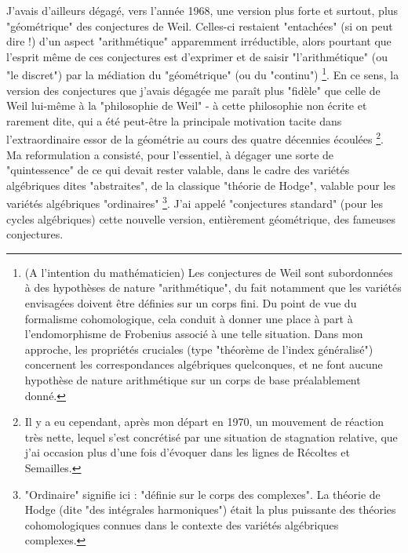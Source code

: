 J'avais d'ailleurs dégagé, vers l'année 1968, une version plus forte et surtout, plus "géométrique" des conjectures de Weil. Celles-ci restaient "entachées" (si on peut dire !) d'un aspect "arithmétique" apparemment irréductible, alors pourtant que l'esprit même de ces conjectures est d'exprimer et de saisir "l'arithmétique" (ou "le discret") par la médiation du "géométrique" (ou du "continu") \footnote{(A l'intention du mathématicien) Les conjectures de Weil sont subordonnées à des hypothèses de nature "arithmétique", du fait notamment que les variétés envisagées doivent être définies sur un corps fini. Du point de vue du formalisme cohomologique, cela conduit à donner une place à part à l'endomorphisme de Frobenius associé à une telle situation. Dans mon approche, les propriétés cruciales (type "théorème de l'index généralisé") concernent les correspondances algébriques quelconques, et ne font aucune hypothèse de nature arithmétique sur un corps de base préalablement donné.}. En ce sens, la version des conjectures que j'avais dégagée me paraît plus "fidèle" que celle de Weil lui-même à la "philosophie de Weil" - à cette philosophie non écrite et rarement dite, qui a été peut-être la principale motivation tacite dans l'extraordinaire essor de la géométrie au cours des quatre décennies écoulées \footnote{Il y a eu cependant, après mon départ en 1970, un mouvement de réaction très nette, lequel s'est concrétisé par une situation de stagnation relative, que j'ai occasion plus d'une fois d'évoquer dans les lignes de Récoltes et Semailles.}. Ma reformulation a consisté, pour l'essentiel, à dégager une sorte de "quintessence" de ce qui devait rester valable, dans le cadre des variétés algébriques dites "abstraites", de la classique "théorie de Hodge", valable pour les variétés algébriques "ordinaires" \footnote{"Ordinaire" signifie ici : "définie sur le corps des complexes". La théorie de Hodge (dite "des intégrales harmoniques") était la plus puissante des théories cohomologiques connues dans le contexte des variétés algébriques complexes.}. J'ai appelé "conjectures standard" (pour les cycles algébriques) cette nouvelle version, entièrement géométrique, des fameuses conjectures.

